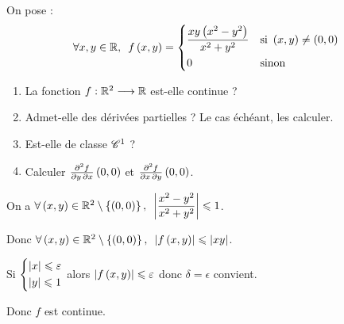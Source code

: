 \begin{corr}
\end{corr}

\begin{exo}
On pose : \[\quantifs{\forall x,y\in\R}f\paren{x,y}=\begin{dcases}
\dfrac{xy\paren{x^2-y^2}}{x^2+y^2} &\text{si }\paren{x,y}\not=\paren{0,0} \\
0 &\text{sinon}
\end{dcases}\]

\begin{enumerate}
    \item La fonction \(f:\mathbb{R}^2\longrightarrow\mathbb{R}\) est-elle continue ? \\
    \item Admet-elle des dérivées partielles ? Le cas échéant, les calculer. \\
    \item Est-elle de classe \(\mathscr{C}^{1}\) ? \\
    \item Calculer \(\pdv{f}{y,x}\left(0,0\right)\) et \(\pdv{f}{x,y}\left(0,0\right)\).
\end{enumerate}
\end{exo}

\begin{corr}[1]
On a \(\quantifs{\forall\paren{x,y}\in\R^2\excluant\accol{\paren{0,0}}}\abs{\dfrac{x^2-y^2}{x^2+y^2}}\leq1\).

Donc \(\quantifs{\forall\paren{x,y}\in\R^2\excluant\accol{\paren{0,0}}}\abs{f\paren{x,y}}\leq\abs{xy}\).

Si \(\begin{dcases}
\left\lvert x\right\rvert\leqslant\varepsilon \\
\left\lvert y\right\rvert\leqslant1
\end{dcases}\) alors \(\left\lvert f\left(x,y\right)\right\rvert\leqslant\varepsilon\) donc \(\delta=\epsilon\) convient.

Donc \(f\) est continue.
\end{corr}

